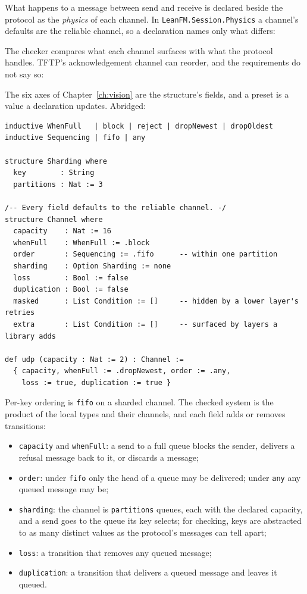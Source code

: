 What happens to a message between send and receive is declared beside the
protocol as the \emph{physics} of each channel. In
\texttt{LeanFM.Session.Physics} a channel's defaults are the reliable channel, so a
declaration names only what differs:



The checker compares what each channel surfaces with what the protocol handles.
TFTP's acknowledgement channel can reorder, and the requirements do not say so:



The six axes of Chapter~\ref{ch:vision} are the structure's fields, and a preset
is a value a declaration updates. Abridged:

\begin{lstlisting}
inductive WhenFull   | block | reject | dropNewest | dropOldest
inductive Sequencing | fifo | any

structure Sharding where
  key        : String
  partitions : Nat := 3

/-- Every field defaults to the reliable channel. -/
structure Channel where
  capacity    : Nat := 16
  whenFull    : WhenFull := .block
  order       : Sequencing := .fifo      -- within one partition
  sharding    : Option Sharding := none
  loss        : Bool := false
  duplication : Bool := false
  masked      : List Condition := []     -- hidden by a lower layer's retries
  extra       : List Condition := []     -- surfaced by layers a library adds

def udp (capacity : Nat := 2) : Channel :=
  { capacity, whenFull := .dropNewest, order := .any,
    loss := true, duplication := true }
\end{lstlisting}

Per-key ordering is \texttt{fifo} on a sharded channel. The checked system is the
product of the local types and their channels, and each field adds or removes
transitions:

\begin{itemize}
  \item \texttt{capacity} and \texttt{whenFull}: a send to a full queue blocks
        the sender, delivers a refusal message back to it, or discards a
        message;
  \item \texttt{order}: under \texttt{fifo} only the head of a queue may be
        delivered; under \texttt{any} any queued message may be;
  \item \texttt{sharding}: the channel is \texttt{partitions} queues, each with
        the declared capacity, and a send goes to the queue its key selects;
        for checking, keys are abstracted to as many distinct values as the
        protocol's messages can tell apart;
  \item \texttt{loss}: a transition that removes any queued message;
  \item \texttt{duplication}: a transition that delivers a queued message and
        leaves it queued.
\end{itemize}

